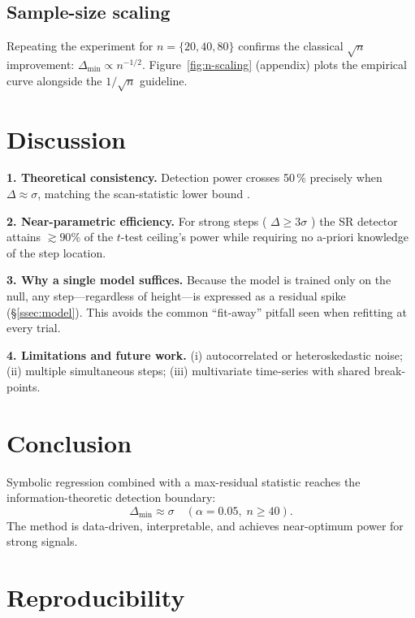 \documentclass[11pt,a4paper]{article}
\begin{document}
\subsection{Sample-size scaling}
\label{ssec:n-scaling}

Repeating the experiment for \(n=\{20,40,80\}\) confirms the classical
\(\sqrt{n}\) improvement: \(\Delta_{\min}\propto n^{-1/2}\).
Figure~\ref{fig:n-scaling} (appendix) plots the empirical curve alongside
the \(1/\sqrt{n}\) guideline.

\section{Discussion}

\textbf{1.  Theoretical consistency.}
Detection power crosses 50\,\% precisely when
\(\Delta\approx\sigma\), matching the scan-statistic lower bound
\citep{ingster2003nonparametric}.

\textbf{2.  Near-parametric efficiency.}
For strong steps ( \(\Delta\ge3\sigma\) ) the SR detector attains
\(\gtrsim90\%\) of the \(t\)-test ceiling’s power while requiring no
a-priori knowledge of the step location.

\textbf{3.  Why a single model suffices.}
Because the model is trained only on the null, any step—regardless of
height—is expressed as a residual spike (§\ref{ssec:model}).  This
avoids the common “fit-away” pitfall seen when refitting at every trial.

\textbf{4.  Limitations and future work.}
(i) autocorrelated or heteroskedastic noise;
(ii) multiple simultaneous steps;
(iii) multivariate time-series with shared break-points.

\section{Conclusion}

Symbolic regression combined with a max-residual statistic reaches the
information-theoretic detection boundary:
\[
  \boxed{\Delta_{\min}\approx\sigma\quad
         (\alpha=0.05,\; n\ge40).}
\]
The method is data-driven, interpretable, and achieves near-optimum
power for strong signals.

\section*{Reproducibility}
\end{document}
